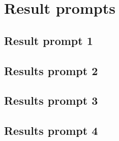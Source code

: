 \documentclass[12pt,a4paper]{article}
\begin{document}




\pagebreak

\section{Result prompts} \label{resPrompts}

\subsection{Result prompt 1} \label{resPrompt1}


\pagebreak


\pagebreak
\subsection{Results prompt 2} \label{resPrompt2}


\pagebreak


\pagebreak
\subsection{Results prompt 3} \label{resPrompt3}


\pagebreak

\pagebreak

\subsection{Results prompt 4} \label{resPrompt4}


\pagebreak

\pagebreak
\end{document}
